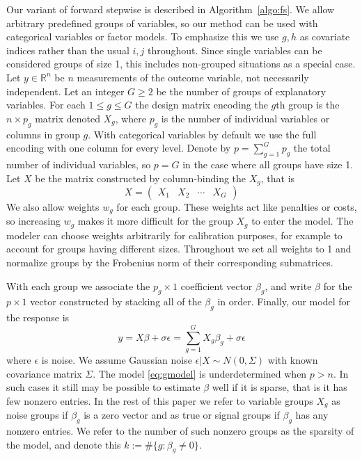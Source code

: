 \documentclass[oupdraft]{bio}
\def\real{{\mathbb R}}
\begin{document}
Our variant of forward stepwise is described in Algorithm~\ref{algo:fs}.
We allow arbitrary predefined groups of variables, so our method can be
used with categorical variables or factor models.
To emphasize this we use $g, h$ as covariate indices rather than
the usual $i, j$ throughout. Since single variables can be considered
groups of size 1, this includes non-grouped situations as a special
case. Let $y \in \real^n$ be $n$ measurements of the outcome
variable, not necessarily independent.
Let an integer $G \geq 2$ be the number of groups of
explanatory variables. For each $1 \leq g \leq G$ the design matrix
encoding the $g$th group is the $n \times p_g$ matrix denoted $X_g$,
where $p_g$ is the number of individual variables or columns in group
$g$. With categorical variables by default we use the full encoding with
one column for every level.
Denote by $p = \sum_{g=1}^Gp_g$ the total number of individual
variables, so $p = G$ in the case where all groups have size 1. Let
$X$ be the matrix constructed by column-binding the $X_g$, that is
\begin{equation*}
X = \begin{pmatrix} X_1 & X_2 & \cdots & X_G  \end{pmatrix}
\end{equation*}
We also allow weights $w_g$ for each group. These
weights act like penalties or costs, so increasing $w_g$ makes it
more difficult for the group $X_g$ to enter the model. The
modeler can choose weights arbitrarily for calibration purposes,
for example to account for groups having different sizes.
Throughout we set all weights to 1 and normalize
groups by the Frobenius norm of their corresponding submatrices.

With each group we associate the $p_g \times 1$ coefficient vector
$\beta_g$, and write $\beta$ for the $p \times 1$ vector constructed
by stacking all of the $\beta_g$ in order.  Finally, our model for the
response is
\begin{equation}
\label{eq:gmodel}
y  = X \beta + \sigma \epsilon  = \sum_{g=1}^G X_g \beta_g + \sigma \epsilon
\end{equation}
where $\epsilon$ is noise. We assume Gaussian noise
$\epsilon | X \sim N(0, \Sigma)$ with known covariance matrix $\Sigma$.
The model \eqref{eq:gmodel} is underdetermined when $p > n$.
In such cases it still may be possible to
estimate $\beta$ well if it is sparse, that is it has few nonzero
entries. In the rest of this paper we refer to variable groups $X_g$
as noise groups if $\beta_g$ is a zero vector and as true or signal
groups if $\beta_g$ has any nonzero entries. We refer to the number
of such nonzero groups as the sparsity of the model, and
denote this $k := \# \{ g : \beta_g \neq 0 \}$.
\end{document}
